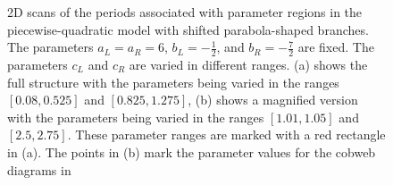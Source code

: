 \begin{figure}
	\centering
	\caption[2D scans of the periods associated with parameter regions in the piecewise-quadratic model with shifted parabola-shaped branches]{
		2D scans of the periods associated with parameter regions in the piecewise-quadratic model with shifted parabola-shaped branches.
		The parameters $a_L = a_R = 6$, $b_L = -\frac{1}{2}$, and $b_R = -\frac{7}{2}$ are fixed.
		The parameters $c_L$ and $c_R$ are varied in different ranges.
		(a) shows the full structure with the parameters being varied in the ranges $[0.08, 0.525]$ and $[0.825, 1.275]$,
		(b) shows a magnified version with the parameters being varied in the ranges $[1.01, 1.05]$ and $[2.5, 2.75]$.
		These parameter ranges are marked with a red rectangle in (a).
		The points in (b) mark the parameter values for the cobweb diagrams in 
	}
	\label{fig:setup.quad.skew.period}
\end{figure}

